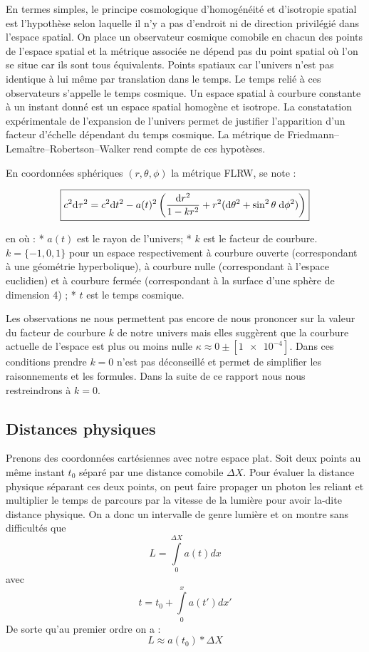 \documentclass[10pt, a4paper]{report}
\numberwithin{equation}{subsection}
\begin{document}
En termes simples, le principe cosmologique d'homogénéité et d'isotropie spatial est l'hypothèse selon laquelle il n'y a pas d'endroit ni de direction privilégié dans l'espace spatial. On place un observateur cosmique comobile en chacun des points de l'espace spatial et la métrique associée ne dépend pas du point spatial où l'on se situe car ils sont tous équivalents. Points spatiaux car l'univers n'est pas identique à lui même par translation dans le temps. Le temps relié à ces observateurs s'appelle le temps cosmique. Un espace spatial à courbure constante à un instant donné est un espace spatial homogène et isotrope.  La constatation expérimentale de l'expansion de l'univers permet de justifier l'apparition d'un facteur d'échelle dépendant du temps cosmique. La métrique de Friedmann–Lemaître–Robertson–Walker rend compte de ces hypotèses.

En coordonnées sphériques $(r, \theta, \phi)$ la métrique FLRW, se note :

\begin{equation}
\boxed{ c^2 {\rm d}\tau^2 = c^2 {\rm d}t^2 - a(t)^2 \left (\frac{{\rm d}r^2}{1 - k r^2} + r^2 ({\rm d}\theta^2 + \sin^2 \theta \; {\rm d} \phi^2) \right )}
\end{equation}

en  où :
* $a(t)$ est le rayon de l'univers;
* $k$ est le facteur de courbure. $k = \{-1,0,1\}$ pour un espace respectivement à courbure ouverte (correspondant à une géométrie hyperbolique), à courbure nulle (correspondant à l'espace euclidien) et à courbure fermée (correspondant à la surface d'une sphère de dimension 4) ;
* $t$ est le temps cosmique.

Les observations ne nous permettent pas encore de nous prononcer sur la valeur du facteur de courbure $k$ de notre univers mais elles suggèrent que la courbure actuelle de l'espace est plus ou moins nulle $ \kappa \approx 0 \pm [\num{1e-4}]$. Dans ces conditions prendre $k=0$ n'est pas déconseillé et permet de simplifier les raisonnements et les formules. Dans la suite de ce rapport nous nous restreindrons à $k=0$. 
\subsection{Distances physiques}
Prenons des coordonnées cartésiennes avec notre espace plat. Soit deux points au même instant $t_0$ séparé par une distance comobile $\Delta X$. Pour évaluer la distance physique séparant ces deux points, on peut faire propager un photon les reliant et multiplier le temps de parcours par la vitesse de la lumière pour avoir la-dite distance physique. On a donc un intervalle de genre lumière et on montre sans difficultés que \begin{equation}
\boxed{ L=\int\limits_0^{\Delta X} a(t)dx}
\end{equation}
avec \begin{equation}
\boxed{ t=t_0 + \int\limits_0^x a(t')dx'}
\end{equation}
De sorte qu'au premier ordre on a :
\begin{equation} \label{eq:foL}
\boxed{ L \approx a(t_0) * \Delta X}
\end{equation}
\end{document}
